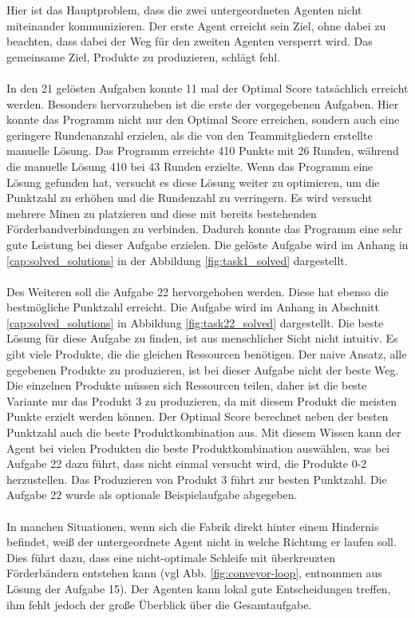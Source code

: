 Hier ist das Hauptproblem, dass die zwei untergeordneten Agenten nicht miteinander kommunizieren. Der erste Agent erreicht sein Ziel, ohne dabei zu beachten, dass dabei der Weg für den zweiten Agenten versperrt wird. Das gemeinsame Ziel, Produkte zu produzieren, schlägt fehl. 
\\\\
In den 21 gelösten Aufgaben konnte 11 mal der Optimal Score tatsächlich erreicht werden. Besonders hervorzuheben ist die erste der vorgegebenen Aufgaben.  Hier konnte das Programm nicht nur den Optimal Score erreichen, sondern auch eine geringere Rundenanzahl erzielen, als die von den Teammitgliedern erstellte manuelle Lösung. Das Programm erreichte 410 Punkte mit 26 Runden, während die manuelle Lösung 410 bei 43 Runden erzielte. Wenn das Programm eine Lösung gefunden hat, versucht es diese Lösung weiter zu optimieren, um die Punktzahl zu erhöhen und die Rundenzahl zu verringern. Es wird versucht mehrere Minen zu platzieren und diese mit bereits bestehenden Förderbandverbindungen zu verbinden. Dadurch konnte das Programm eine sehr gute Leistung bei dieser Aufgabe erzielen.
Die gelöste Aufgabe wird im Anhang in \ref{cap:solved_solutions} in der Abbildung \ref{fig:task1_solved} dargestellt.
\\\\
Des Weiteren soll die Aufgabe 22 hervorgehoben werden.  Diese hat ebenso die bestmögliche Punktzahl erreicht. Die Aufgabe wird im Anhang in Abschnitt \ref{cap:solved_solutions} in Abbildung \ref{fig:task22_solved} dargestellt. Die beste Lösung für diese Aufgabe zu finden, ist aus menschlicher Sicht nicht intuitiv. Es gibt viele Produkte, die die gleichen Ressourcen benötigen. Der naive Ansatz, alle gegebenen Produkte zu produzieren, ist bei dieser Aufgabe nicht der beste Weg. Die einzelnen Produkte müssen sich Ressourcen teilen, daher ist die beste Variante nur das Produkt 3 zu produzieren, da mit diesem Produkt die meisten Punkte erzielt werden können. Der Optimal Score berechnet neben der besten Punktzahl auch die beste Produktkombination aus. Mit diesem Wissen kann der Agent bei vielen Produkten die beste Produktkombination auswählen, was bei Aufgabe 22 dazu führt, dass nicht einmal versucht wird, die Produkte 0-2 herzustellen. Das Produzieren von Produkt 3 führt zur besten Punktzahl. Die Aufgabe 22 wurde als optionale Beispielaufgabe abgegeben.
\\\\
In manchen Situationen, wenn sich die Fabrik direkt hinter einem Hindernis befindet, weiß der untergeordnete Agent nicht in welche Richtung er laufen soll. Dies führt dazu, dass eine nicht-optimale Schleife mit überkreuzten Förderbändern entstehen kann (vgl Abb. \ref{fig:conveyor-loop}, entnommen aus Lösung der Aufgabe 15). Der Agenten kann lokal gute Entscheidungen treffen, ihm fehlt jedoch der große Überblick über die Gesamtaufgabe.


